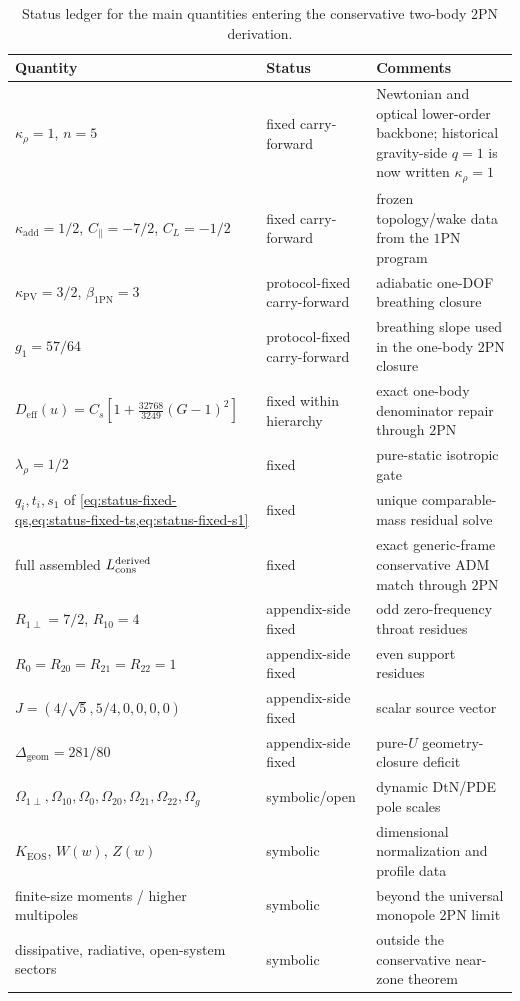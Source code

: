 \documentclass[11pt]{article}
\newcommand{\OnePN}{\mathrm{1PN}}
\newcommand{\TwoPN}{\mathrm{2PN}}
\newcommand{\ADM}{\mathrm{ADM}}
\newcommand{\DtN}{\mathrm{DtN}}
\newcommand{\eff}{\mathrm{eff}}
\newcommand{\geom}{\mathrm{geom}}
\newcommand{\Wproj}{W}
\newcommand{\Zloc}{Z}
\newcommand{\kadd}{\kappa_{\mathrm{add}}}
\newcommand{\kPV}{\kappa_{\mathrm{PV}}}
\newcommand{\krho}{\kappa_{\rho}}
\newcommand{\KEOS}{K_{\mathrm{EOS}}}
\begin{document}
\begin{table}[t]
  \centering
  \caption{Status ledger for the main quantities entering the conservative two-body
  \(\TwoPN\) derivation.}
  \label{tab:status-ledger-2pn}
  \small
  \renewcommand{\arraystretch}{1.15}
  \begin{tabularx}{\linewidth}{@{}L L L@{}}
    \toprule
    Quantity & Status & Comments \\
    \midrule
    \(\krho=1\), \(n=5\) & fixed carry-forward & Newtonian and optical lower-order backbone; historical gravity-side \(q=1\) is now written \(\krho=1\) \\
    \(\kadd=1/2\), \(C_\parallel=-7/2\), \(C_L=-1/2\) & fixed carry-forward & frozen topology/wake data from the \(\OnePN\) program \\
    \(\kPV=3/2\), \(\beta_{\OnePN}=3\) & protocol-fixed carry-forward & adiabatic one-DOF breathing closure \\
    \(g_1=57/64\) & protocol-fixed carry-forward & breathing slope used in the one-body \(\TwoPN\) closure \\
    \(D_{\eff}(u)=C_s[1+\tfrac{32768}{3249}(G-1)^2]\) & fixed within hierarchy & exact one-body denominator repair through \(\TwoPN\) \\
    \(\lambda_\rho=1/2\) & fixed & pure-static isotropic gate \\
    \(q_i,t_i,s_1\) of \cref{eq:status-fixed-qs,eq:status-fixed-ts,eq:status-fixed-s1} & fixed & unique comparable-mass residual solve \\
    full assembled \(L_{\rm cons}^{\rm derived}\) & fixed & exact generic-frame conservative \(\ADM\) match through \(\TwoPN\) \\
    \(R_{1\perp}=7/2\), \(R_{10}=4\) & appendix-side fixed & odd zero-frequency throat residues \\
    \(R_0=R_{20}=R_{21}=R_{22}=1\) & appendix-side fixed & even support residues \\
    \(J=(4/\sqrt5,5/4,0,0,0,0)\) & appendix-side fixed & scalar source vector \\
    \(\Delta_{\geom}=281/80\) & appendix-side fixed & pure-\(U\) geometry-closure deficit \\
    \(\Omega_{1\perp},\Omega_{10},\Omega_0,\Omega_{20},\Omega_{21},\Omega_{22},\Omega_g\) & symbolic/open & dynamic \(\DtN\)/PDE pole scales \\
    \(\KEOS\), \(\Wproj(w)\), \(\Zloc(w)\) & symbolic & dimensional normalization and profile data \\
    finite-size moments / higher multipoles & symbolic & beyond the universal monopole \(\TwoPN\) limit \\
    dissipative, radiative, open-system sectors & symbolic & outside the conservative near-zone theorem \\
    \bottomrule
  \end{tabularx}
\end{table}
\end{document}
